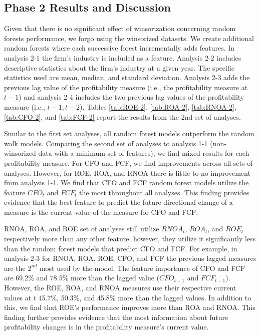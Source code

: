 \subsection{Phase 2 Results and Discussion}

Given that there is no significant effect of winsorization concerning random forests performance, we forgo using the winsorized datasets. We create additional random forests where each successive forest incrementally adds features. In analysis 2-1 the firm's industry is included as a feature. Analysis 2-2 includes descriptive statistics about the firm's industry at a given year. The specific statistics used are mean, median, and standard deviation. Analysis 2-3 adds the previous lag value of the profitability measure (i.e., the profitability measure at \(t-1\)) and analysis 2-4 includes the two previous lag values of the profitability measure (i.e., \(t-1, t-2\)). Tables \ref{tab:ROE-2}, \ref{tab:ROA-2}, \ref{tab:RNOA-2}, \ref{tab:CFO-2}, and \ref{tab:FCF-2} report the results from the 2nd set of analyses. 

Similar to the first set analyses, all random forest models outperform the random walk models. Comparing the second set of analyses to analysis 1-1 (non-winsorized data with a minimum set of features), we find mixed results for each profitability measure. For CFO and FCF, we find improvements across all sets of analyses. However, for ROE, ROA, and RNOA there is little to no improvement from analysis 1-1.  We find that CFO and FCF random forest models utilize the feature \(CFO_t\) and \(FCF_t\) the most throughout all analyses. This finding provides evidence that the best feature to predict the future directional change of a measure is the current value of the measure for CFO and FCF. 

RNOA, ROA, and ROE set of analyses still utilize \(RNOA_t\), \(ROA_t\), and \(ROE_t\) respectively more than any other feature; however, they utilize it significantly less than the random forest models that predict CFO and FCF. For example, in analysis 2-3  for RNOA, ROA, ROE, CFO, and FCF the previous lagged measures are the \(2^{nd}\) most used by the model. The feature importance of CFO and FCF are 69.2\% and 78.5\% more than the lagged value (\(CFO_{t-1}\) and \(FCF_{t-1}\)). However, the ROE, ROA, and RNOA measures use their respective current values at \(t\) 45.7\%, 50.3\%, and 45.8\% more than the lagged values. In addition to this, we find that ROE's performance improves more than ROA and RNOA. This finding further provides evidence that the most information about future profitability changes is in the profitability measure's current value.

